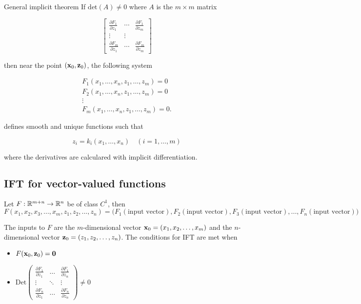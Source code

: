 \begin{mybox}{General implicit theorem}
    If $\mathrm{det}(A)\neq 0$ where $A$ is the $m\times m$ matrix 

    \[
        \left[\begin{array}{ccc}
            \frac{\partial F_{1}}{\partial z_{1}} & \cdots & \frac{\partial F_{1}}{\partial z_{m}} \\
            \vdots & \vdots \\
            \frac{\partial F_{m}}{\partial z_{1}} & \cdots & \frac{\partial F_{m}}{\partial z_{m}}
        \end{array}\right]
    \]

    then near the point $(\textbf x_0,\textbf z_0)$, the following system 

    \[\begin{array}{c}
        F_{1}\left(x_{1}, \ldots, x_{n}, z_{1}, \ldots, z_{m}\right)=0 \\
        F_{2}\left(x_{1}, \ldots, x_{n}, z_{1}, \ldots, z_{m}\right)=0 \\
        \vdots \\
        F_{m}\left(x_{1}, \ldots, x_{n}, z_{1}, \ldots, z_{m}\right)=0 .
    \end{array}\]

    defines smooth and unique functions such that 

    \[z_{i}=k_{i}\left(x_{1}, \ldots, x_{n}\right) \quad(i=1, \ldots, m)\]

    where the derivatives are calculared with implicit differentiation.
\end{mybox}

\subsection{IFT for vector-valued functions}

Let $F:\mathbb{R}^{m+n}\to \mathbb{R}^n$ be of class $C^1$, then 
\[F(x_1, x_2, x_3,...,x_m, z_1, z_2, ..., z_n)=\Big(F_1(\mbox{input vector}), F_2(\mbox{input vector}), F_3(\mbox{input vector}),...,F_n(\mbox{input vector})\Big)\]

The inputs to $F$ are the $m$-dimensional vector $\textbf x_0=(x_1,x_2,\ldots,x_m)$ and the $n$-dimensional vector $\textbf z_0=(z_1,z_2,\ldots, z_n)$.
The conditions for IFT are met when
\begin{itemize}
    \item $F(\textbf x_0,\textbf z_0)=\textbf 0$
    \item $\mbox{Det}\left(
        \begin{matrix}
        \frac{\partial F_1}{\partial z_1}&\dots&\frac{\partial F_1}{\partial z_n}\\
        \vdots&\ddots&\vdots\\
        \frac{\partial F_n}{\partial z_1}&\dots&\frac{\partial F_n}{\partial z_n}
        \end{matrix}
        \right)\neq 0$
\end{itemize}

